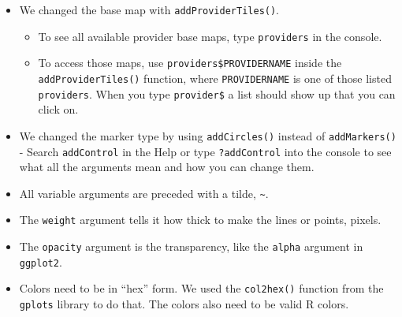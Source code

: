 \documentclass[
  letterpaper,
  DIV=11,
  numbers=noendperiod]{scrreprt}
\newenvironment{Shaded}{\begin{snugshade}}{\end{snugshade}}
\newcommand{\AttributeTok}[1]{\textcolor[rgb]{0.40,0.45,0.13}{#1}}
\newcommand{\DecValTok}[1]{\textcolor[rgb]{0.68,0.00,0.00}{#1}}
\newcommand{\FunctionTok}[1]{\textcolor[rgb]{0.28,0.35,0.67}{#1}}
\newcommand{\NormalTok}[1]{\textcolor[rgb]{0.00,0.23,0.31}{#1}}
\newcommand{\SpecialCharTok}[1]{\textcolor[rgb]{0.37,0.37,0.37}{#1}}
\newcommand{\StringTok}[1]{\textcolor[rgb]{0.13,0.47,0.30}{#1}}
\begin{document}
\begin{itemize}
\item
  We changed the base map with \texttt{addProviderTiles()}.

  \begin{itemize}
  \item
    To see all available provider base maps, type \texttt{providers} in
    the console.
  \item
    To access those maps, use \texttt{providers\$PROVIDERNAME} inside
    the \texttt{addProviderTiles()} function, where
    \texttt{PROVIDERNAME} is one of those listed \texttt{providers}.
    When you type \texttt{provider\$} a list should show up that you can
    click on.
  \end{itemize}
\item
  We changed the marker type by using \texttt{addCircles()} instead of
  \texttt{addMarkers()} - Search \texttt{addControl} in the Help or type
  \texttt{?addControl} into the console to see what all the arguments
  mean and how you can change them.
\item
  All variable arguments are preceded with a tilde,
  \texttt{\textasciitilde{}}.
\item
  The \texttt{weight} argument tells it how thick to make the lines or
  points, pixels.
\item
  The \texttt{opacity} argument is the transparency, like the
  \texttt{alpha} argument in \texttt{ggplot2}.
\item
  Colors need to be in ``hex'' form. We used the \texttt{col2hex()}
  function from the \texttt{gplots} library to do that. The colors also
  need to be valid R colors.
\end{itemize}

\begin{Shaded}
\end{Shaded}
\end{document}
